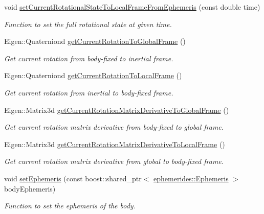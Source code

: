 \begin{DoxyCompactItemize}
void \hyperlink{classtudat_1_1simulation__setup_1_1Body_afb338d46d3f9de1df04b929ed3766292}{set\+Current\+Rotational\+State\+To\+Local\+Frame\+From\+Ephemeris} (const double time)
\begin{DoxyCompactList}\small\item\em Function to set the full rotational state at given time. \end{DoxyCompactList}\item 
Eigen\+::\+Quaterniond \hyperlink{classtudat_1_1simulation__setup_1_1Body_a4c6c29c88751b36dbb09348115c436e2}{get\+Current\+Rotation\+To\+Global\+Frame} ()
\begin{DoxyCompactList}\small\item\em Get current rotation from body-\/fixed to inertial frame. \end{DoxyCompactList}\item 
Eigen\+::\+Quaterniond \hyperlink{classtudat_1_1simulation__setup_1_1Body_a7eaf728cdc11cf98ac7e7b75e38b62ca}{get\+Current\+Rotation\+To\+Local\+Frame} ()
\begin{DoxyCompactList}\small\item\em Get current rotation from inertial to body-\/fixed frame. \end{DoxyCompactList}\item 
Eigen\+::\+Matrix3d \hyperlink{classtudat_1_1simulation__setup_1_1Body_a0946c1b5fa661abd9935041ca7bc37ac}{get\+Current\+Rotation\+Matrix\+Derivative\+To\+Global\+Frame} ()
\begin{DoxyCompactList}\small\item\em Get current rotation matrix derivative from body-\/fixed to global frame. \end{DoxyCompactList}\item 
Eigen\+::\+Matrix3d \hyperlink{classtudat_1_1simulation__setup_1_1Body_a0cd33824b4bbd33c4ca120098a5bebd4}{get\+Current\+Rotation\+Matrix\+Derivative\+To\+Local\+Frame} ()
\begin{DoxyCompactList}\small\item\em Get current rotation matrix derivative from global to body-\/fixed frame. \end{DoxyCompactList}\item 
void \hyperlink{classtudat_1_1simulation__setup_1_1Body_ab9ee176fb6d8f2a8f9df7d1acce3ef24}{set\+Ephemeris} (const boost\+::shared\+\_\+ptr$<$ \hyperlink{classtudat_1_1ephemerides_1_1Ephemeris}{ephemerides\+::\+Ephemeris} $>$ body\+Ephemeris)
\begin{DoxyCompactList}\small\item\em Function to set the ephemeris of the body. \end{DoxyCompactList}\item 

\end{DoxyCompactItemize}
